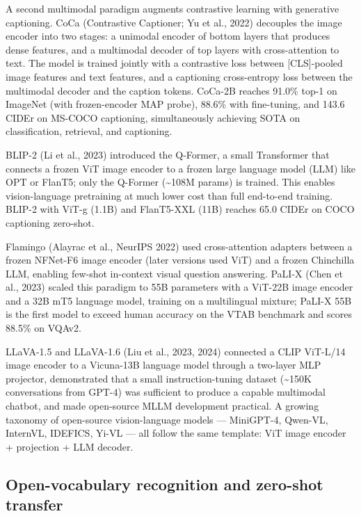 A second multimodal paradigm augments contrastive learning with generative captioning. CoCa (Contrastive Captioner; Yu et al., 2022) decouples the image encoder into two stages: a unimodal encoder of bottom layers that produces dense features, and a multimodal decoder of top layers with cross-attention to text. The model is trained jointly with a contrastive loss between {[}CLS{]}-pooled image features and text features, and a captioning cross-entropy loss between the multimodal decoder and the caption tokens. CoCa-2B reaches 91.0\% top-1 on ImageNet (with frozen-encoder MAP probe), 88.6\% with fine-tuning, and 143.6 CIDEr on MS-COCO captioning, simultaneously achieving SOTA on classification, retrieval, and captioning.

BLIP-2 (Li et al., 2023) introduced the Q-Former, a small Transformer that connects a frozen ViT image encoder to a frozen large language model (LLM) like OPT or FlanT5; only the Q-Former (\textasciitilde108M params) is trained. This enables vision-language pretraining at much lower cost than full end-to-end training. BLIP-2 with ViT-g (1.1B) and FlanT5-XXL (11B) reaches 65.0 CIDEr on COCO captioning zero-shot.

Flamingo (Alayrac et al., NeurIPS 2022) used cross-attention adapters between a frozen NFNet-F6 image encoder (later versions used ViT) and a frozen Chinchilla LLM, enabling few-shot in-context visual question answering. PaLI-X (Chen et al., 2023) scaled this paradigm to 55B parameters with a ViT-22B image encoder and a 32B mT5 language model, training on a multilingual mixture; PaLI-X 55B is the first model to exceed human accuracy on the VTAB benchmark and scores 88.5\% on VQAv2.

LLaVA-1.5 and LLaVA-1.6 (Liu et al., 2023, 2024) connected a CLIP ViT-L/14 image encoder to a Vicuna-13B language model through a two-layer MLP projector, demonstrated that a small instruction-tuning dataset (\textasciitilde150K conversations from GPT-4) was sufficient to produce a capable multimodal chatbot, and made open-source MLLM development practical. A growing taxonomy of open-source vision-language models --- MiniGPT-4, Qwen-VL, InternVL, IDEFICS, Yi-VL --- all follow the same template: ViT image encoder + projection + LLM decoder.

\subsection{Open-vocabulary recognition and zero-shot transfer}\label{open-vocabulary-recognition-and-zero-shot-transfer}

